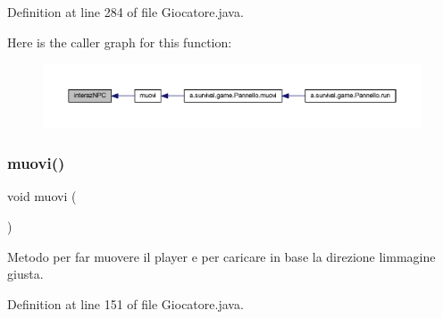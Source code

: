 Definition at line 284 of file Giocatore.\+java.

Here is the caller graph for this function\+:
\nopagebreak
\begin{figure}[H]
\begin{center}
\leavevmode
\includegraphics[width=350pt]{class_entita_1_1_giocatore_aaf1d3a52e79be598afe385c91a9f4d0c_icgraph}
\end{center}
\end{figure}
\mbox{\label{class_entita_1_1_giocatore_a1fe2f184b3cc7345c6a0f08d183a1d0b}} 
\subsubsection{\texorpdfstring{muovi()}{muovi()}}
{\footnotesize\ttfamily void muovi (\begin{DoxyParamCaption}{ }\end{DoxyParamCaption})}



Metodo per far muovere il player e per caricare in base la direzione l\textquotesingle{}immagine giusta. 



Definition at line 151 of file Giocatore.\+java.

